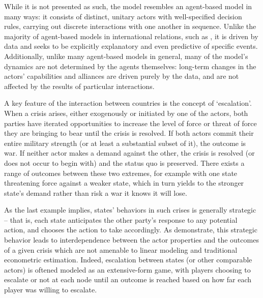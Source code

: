While it is not presented as such, the \citet{bdm_1992} model resembles an agent-based model in many ways: it consists of distinct, unitary actors with well-specified decision rules, carrying out discrete interactions with one another in sequence. Unlike the majority of agent-based models in international relations, such as \citet{axelrod_1997,cederman_1997,min_2002}, it is driven by data and seeks to be explicitly explanatory and even predictive of specific events. Additionally, unlike many agent-based models in general, many of the model's dynamics are not determined by the agents themselves: long-term changes in the actors' capabilities and alliances are driven purely by the data, and are not affected by the results of particular interactions.

A key feature of the interaction between countries is the concept of `escalation'. When a crisis arises, either exogenously or initiated by one of the actors, both parties have iterated opportunities to increase the level of force or threat of force they are bringing to bear until the crisis is resolved. If both actors commit their entire military strength (or at least a substantial subset of it), the outcome is war. If neither actor makes a demand against the other, the crisis is resolved (or does not occur to begin with) and the status quo is preserved. There exists a range of outcomes between these two extremes, for example with one state threatening force against a weaker state, which in turn yields to the stronger state's demand rather than risk a war it knows it will lose.

As the last example implies, states' behaviors in such crises is generally strategic -- that is, each state anticipates the other party's response to any potential action, and chooses the action to take accordingly. As \citet{signorino_1999,smith_1999} demonstrate, this strategic behavior leads to interdependence between the actor properties and the outcomes of a given crisis which are not amenable to linear modeling and traditional econometric estimation. Indeed, escalation between states (or other comparable actors) is oftened modeled as an extensive-form game, with players choosing to escalate or not at each node until an outcome is reached based on how far each player was willing to escalate. 

